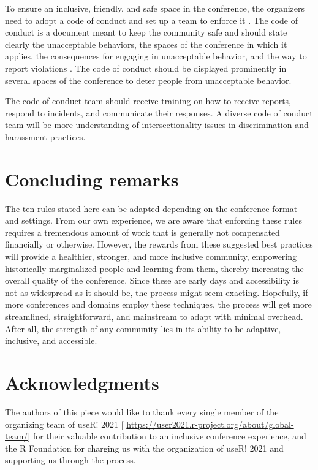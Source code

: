 \documentclass[10pt,letterpaper]{article}
\begin{document}
To ensure an inclusive, friendly, and safe space in the conference, the organizers need to adopt a code of conduct and set up a team to enforce it \cite{favaro_your_2016}. The code of conduct is a document meant to keep the community safe and should state clearly the unacceptable behaviors, the spaces of the conference in which it applies, the consequences for engaging in unacceptable behavior, and the way to report violations \cite{aurora_how_2018}.%
The code of conduct should be displayed prominently in several spaces of the conference to deter people from unacceptable behavior.

The code of conduct team should receive training on how to receive reports, respond to incidents, and communicate their responses. A diverse code of conduct team will be more understanding of intersectionality issues in discrimination and harassment practices. 



\section*{Concluding remarks}

The ten rules stated here can be adapted depending on the conference format and settings. From our own experience, we are aware that enforcing these rules requires a tremendous amount of work that is generally not compensated financially or otherwise. However, the rewards from these suggested best practices will provide a healthier, stronger, and more inclusive community, empowering historically marginalized people and learning from them, thereby increasing the overall quality of the conference. Since these are early days and accessibility is not as widespread as it should be, the process might seem exacting. Hopefully, if more conferences and domains employ these techniques, the process will get more streamlined, straightforward, and mainstream to adapt with minimal overhead. After all, the strength of any community lies in its ability to be adaptive, inclusive, and accessible.


\section*{Acknowledgments}
The authors of this piece would like to thank every single member of the organizing team of useR! 2021 [ \url{https://user2021.r-project.org/about/global-team/}] for their valuable contribution to an inclusive conference experience, and the R Foundation for charging us with the organization of useR! 2021 and supporting us through the process. 
\end{document}
